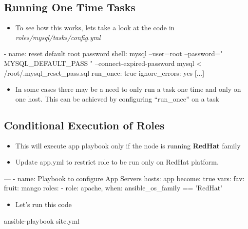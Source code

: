 \subsection{Running One Time Tasks}

\begin{itemize}
\item To see how this works, lets take a look at the code in \emph{roles/mysql/tasks/config.yml}
\end{itemize}

\begin{code}
        [...]
- name: reset default root password
shell: mysql --user=root --password="{{ MYSQL_DEFAULT_PASS }}" --connect-expired-password mysql < /root/.mysql_reset_pass.sql
run_once: true
ignore_errors: yes
       [...]
\end{code}

\begin{itemize}
\item In some cases there may be a need to only run a task one time and only on one host. This can be achieved by configuring “run\_once” on a task
\end{itemize}

\subsection{Conditional Execution of Roles}

\begin{itemize}
\item This will execute app playbook only if the node is running \textbf{RedHat} family  
\item Update app.yml to restrict role to be run only on RedHat platform.
\end{itemize}

\begin{code}
---
  - name: Playbook to configure App Servers
    hosts: app
    become: true
    vars:
      fav:
        fruit: mango
    roles:
    - { role: apache, when: ansible_os_family == 'RedHat' }
\end{code}

\begin{itemize}
\item Let's run this code
\end{itemize}

\begin{code}
ansible-playbook site.yml
\end{code}

